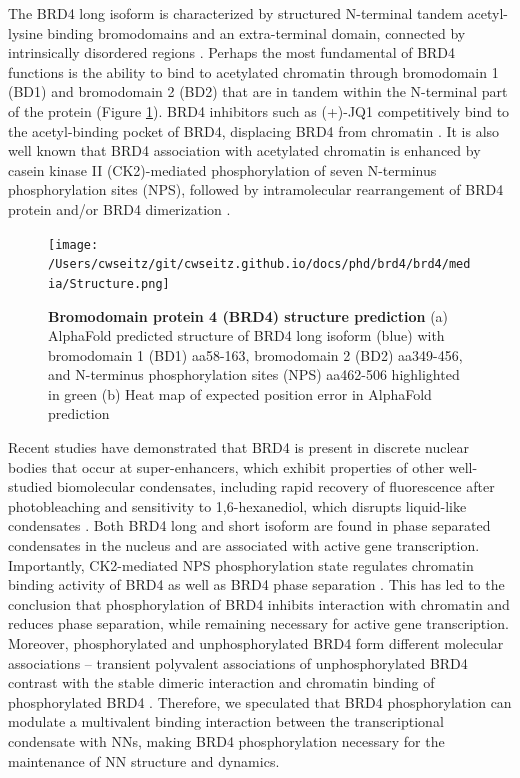 The BRD4 long isoform is characterized by structured N-terminal tandem acetyl-lysine binding bromodomains and an extra-terminal domain, connected by intrinsically disordered regions \parencite{Han2020}. Perhaps the most fundamental of BRD4 functions is the ability to bind to acetylated chromatin through bromodomain 1 (BD1) and bromodomain 2 (BD2) that are in tandem within the N-terminal part of the protein (Figure \ref{fig:fig22}). BRD4 inhibitors such as (+)-JQ1 competitively bind to the acetyl-binding pocket of BRD4, displacing BRD4 from chromatin \parencite{Filippakopoulos2010}. It is also well known that BRD4 association with acetylated chromatin is enhanced by casein kinase II (CK2)-mediated phosphorylation of seven N-terminus phosphorylation sites (NPS), followed by intramolecular rearrangement of BRD4 protein and/or BRD4 dimerization \parencite{Wu2013,Malvezzi2021}.

\begin{figure}[t]
\centering
\texttt{[image: /Users/cwseitz/git/cwseitz.github.io/docs/phd/brd4/brd4/media/Structure.png]}
\caption{\textbf{Bromodomain protein 4 (BRD4) structure prediction} (a) AlphaFold predicted structure of BRD4 long isoform (blue) with bromodomain 1 (BD1) aa58-163, bromodomain 2 (BD2) aa349-456, and N-terminus phosphorylation sites (NPS) aa462-506 highlighted in green (b) Heat map of expected position error in AlphaFold prediction}
\label{fig:fig22}
\end{figure}

Recent studies have demonstrated that BRD4 is present in discrete nuclear bodies that occur at super-enhancers, which exhibit properties of other well-studied biomolecular condensates, including rapid recovery of fluorescence after photobleaching and sensitivity to 1,6-hexanediol, which disrupts liquid-like condensates \parencite{Sabari2018}. Both BRD4 long and short isoform are found in phase separated condensates in the nucleus and are associated with active gene transcription. Importantly, CK2-mediated NPS phosphorylation state regulates chromatin binding activity of BRD4 as well as BRD4 phase separation \parencite{Han2020}. This has led to the conclusion that phosphorylation of BRD4 inhibits interaction with chromatin and reduces phase separation, while remaining necessary for active gene transcription. Moreover, phosphorylated and unphosphorylated BRD4 form different molecular associations – transient polyvalent associations of unphosphorylated BRD4 contrast with the stable dimeric interaction and chromatin binding of phosphorylated BRD4 \parencite{Malvezzi2021}. Therefore, we speculated that BRD4 phosphorylation can modulate a multivalent binding interaction between the transcriptional condensate with NNs, making BRD4 phosphorylation necessary for the maintenance of NN structure and dynamics.


